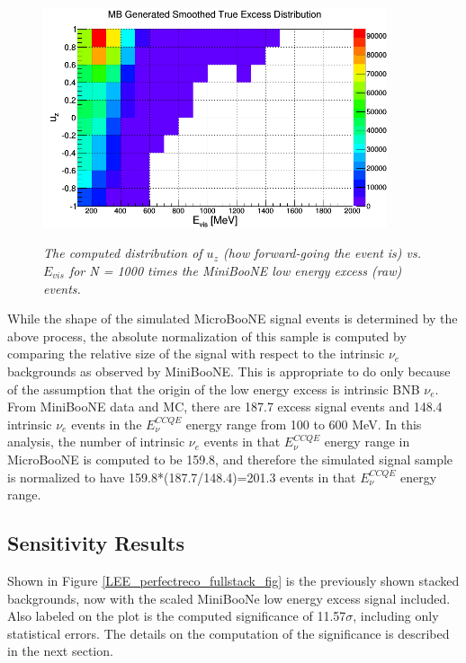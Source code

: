 \begin{figure}[ht!]
\centering
	\includegraphics[width=0.9\textwidth]{Figures/miniboone_excess_th2d.png} \\
\caption{\textit{The computed distribution of $u_z$ (how forward-going the event is) vs. $E_{vis}$ for N = 1000 times the MiniBooNE low energy excess (raw) events.}}\label{MBth2dfig}
\end{figure}

While the shape of the simulated MicroBooNE signal events is determined by the above process, the absolute normalization of this sample is computed by comparing the relative size of the signal with respect to the intrinsic $\nu_e$ backgrounds as observed by MiniBooNE. This is appropriate to do only because of the assumption that the origin of the low energy excess is intrinsic BNB $\nu_e$. From MiniBooNE data and MC, there are 187.7 excess signal events and 148.4 intrinsic $\nu_e$ events in the $E_\nu^{CCQE}$ energy range from 100 to 600 MeV. In this analysis, the number of intrinsic $\nu_e$ events in that $E_\nu^{CCQE}$ energy range in MicroBooNE is computed to be 159.8, and therefore the simulated signal sample is normalized to have 159.8*(187.7/148.4)=201.3 events in that $E_\nu^{CCQE}$ energy range.\\







\subsection{Sensitivity Results}

Shown in Figure \ref{LEE_perfectreco_fullstack_fig} is the previously shown stacked backgrounds, now with the scaled MiniBooNe low energy excess signal included. Also labeled on the plot is the computed significance of 11.57$\sigma$, including only statistical errors. The details on the computation of the significance is described in the next section.

